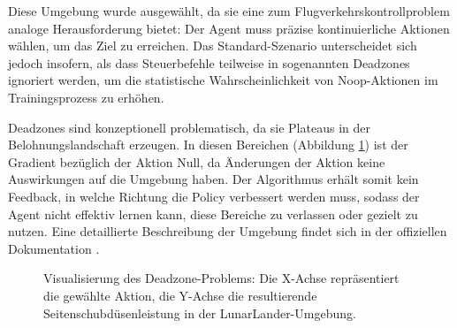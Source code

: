 Diese Umgebung wurde ausgewählt, da sie eine zum Flugverkehrskontrollproblem analoge Herausforderung bietet: Der Agent muss präzise kontinuierliche Aktionen wählen, um das Ziel zu erreichen. Das Standard-Szenario unterscheidet sich jedoch insofern, als dass Steuerbefehle teilweise in sogenannten Deadzones ignoriert werden, um die statistische Wahrscheinlichkeit von Noop\hyp{}Aktionen im Trainingsprozess zu erhöhen.
\medskip

Deadzones sind konzeptionell problematisch, da sie Plateaus in der Belohnungslandschaft erzeugen.
In diesen Bereichen (Abbildung \ref{fig:deadzone_plot}) ist der Gradient bezüglich der Aktion Null, da Änderungen der Aktion keine Auswirkungen auf die Umgebung haben.
Der Algorithmus erhält somit kein Feedback, in welche Richtung die Policy verbessert werden muss, sodass der Agent nicht effektiv lernen kann, diese Bereiche zu verlassen oder gezielt zu nutzen. Eine detaillierte Beschreibung der Umgebung findet sich in der offiziellen Dokumentation \cite{lunar_lander_doc}.

\begin{figure}[htbp]
    \centering
    \caption[Deadzone-Problem]{Visualisierung des Deadzone-Problems: Die X-Achse repräsentiert die gewählte Aktion, die Y-Achse die resultierende Seitenschubdüsenleistung in der LunarLander-Umgebung.}
    \label{fig:deadzone_plot}
\end{figure}
\medskip

